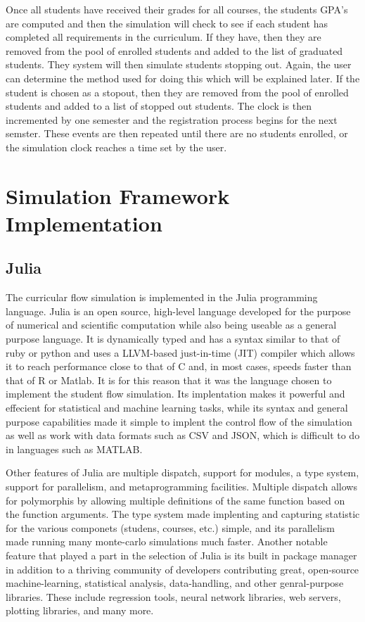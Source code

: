 \documentclass[botnum, fleqn]{unmeethesis}
\begin{document}
Once all students have received their grades for all courses, the students GPA's are computed and then the simulation will check to see if each student has completed all requirements in the curriculum. If they have, then they are removed from the pool of enrolled students and added to the list of graduated students. They system will then simulate students stopping out. Again, the user can determine the method used for doing this which will be explained later. If the student is chosen as a stopout, then they are removed from the pool of enrolled students and added to a list of stopped out students. The clock is then incremented by one semester and the registration process begins for the next semster. These events are then repeated until there are no students enrolled, or the simulation clock reaches a time set by the user.


\chapter{Simulation Framework Implementation}

\section{Julia}
The curricular flow simulation is implemented in the Julia programming language. Julia is an open source, high-level language developed for the purpose of numerical and scientific computation while also being useable as a general purpose language. It is dynamically typed and has a syntax similar to that of ruby or python and uses a LLVM-based just-in-time (JIT) compiler which allows it to reach performance close to that of C and, in most cases, speeds faster than that of R or Matlab. It is for this reason that it was the language chosen to implement the student flow simulation. Its implentation makes it powerful and effecient for statistical and machine learning tasks, while its syntax and general purpose capabilities made it simple to implent the control flow of the simulation as well as work with data formats such as CSV and JSON, which is difficult to do in languages such as MATLAB.

Other features of Julia are multiple dispatch, support for modules, a type system, support for parallelism, and metaprogramming facilities. Multiple dispatch allows for polymorphis by allowing multiple definitions of the same function based on the function arguments. The type system made implenting and capturing statistic for the various componets (studens, courses, etc.) simple, and its parallelism made running many monte-carlo simulations much faster. Another notable feature that played a part in the selection of Julia is its built in package manager in addition to a thriving community of developers contributing great, open-source machine-learning, statistical analysis, data-handling, and other genral-purpose libraries. These include regression tools, neural network libraries, web servers, plotting libraries, and many more.
\end{document}

